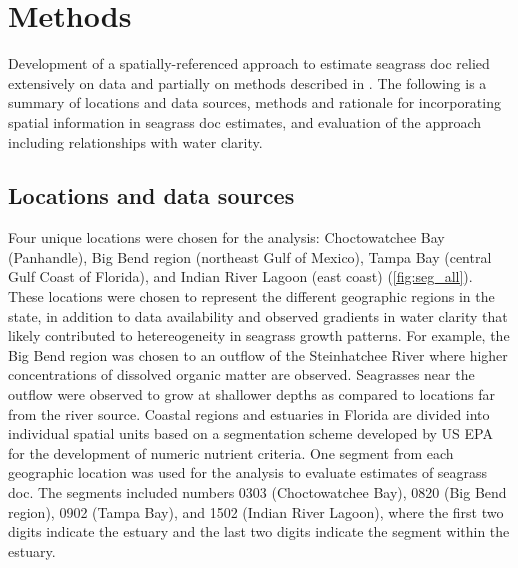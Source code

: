 \documentclass[letterpaper,12pt,oneside]{article}\usepackage[]{graphicx}\usepackage[]{color}
\begin{document}
\section{Methods}

Development of a spatially-referenced approach to estimate seagrass \ac{doc} relied extensively on data and partially on methods described in .  The following is a summary of locations and data sources, methods and rationale for incorporating spatial information in seagrass \ac{doc} estimates, and evaluation of the approach including relationships with water clarity.   

\subsection{Locations and data sources}

Four unique locations were chosen for the analysis: Choctowatchee Bay (Panhandle), Big Bend region (northeast Gulf of Mexico), Tampa Bay (central Gulf Coast of Florida), and Indian River Lagoon (east coast) (\cref{fig:seg_all}).  These locations were chosen to represent the different geographic regions in the state, in addition to data availability and observed gradients in water clarity that likely contributed to hetereogeneity in seagrass growth patterns.  For example, the Big Bend region was chosen to an outflow of the Steinhatchee River where higher concentrations of dissolved organic matter are observed.  Seagrasses near the outflow were observed to grow at shallower depths as compared to locations far from the river source.  Coastal regions and estuaries in Florida are divided into individual spatial units based on a segmentation scheme developed by US \ac{EPA} for the development of numeric nutrient criteria.  One segment from each geographic location was used for the analysis to evaluate estimates of seagrass \ac{doc}.  The segments included numbers 0303 (Choctowatchee Bay), 0820 (Big Bend region), 0902 (Tampa Bay), and 1502 (Indian River Lagoon), where the first two digits indicate the estuary and the last two digits indicate the segment within the estuary. 
\end{document}
